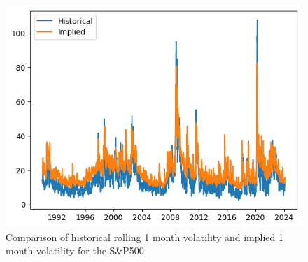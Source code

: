 \begin{figure}[ht]
    \includegraphics[width=\linewidth]{assets/hist-vs-impl-vol.png}
    \caption{Comparison of historical rolling 1 month volatility and implied 1 month volatility for the S\&P500}
    \label{fig:hist-vs-impl-vol}
\end{figure}

